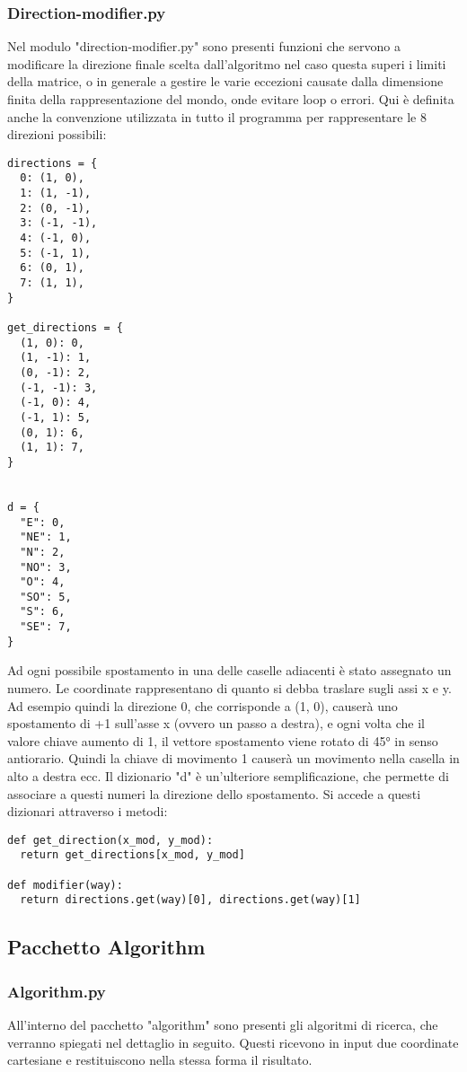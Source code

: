 \subsubsection{Direction-modifier.py}
Nel modulo "direction-modifier.py" sono presenti funzioni che servono a modificare la direzione finale scelta dall'algoritmo nel caso questa superi i limiti della matrice, o in generale a gestire le varie eccezioni causate dalla dimensione finita della rappresentazione del mondo, onde evitare loop o errori. Qui è definita anche la convenzione utilizzata in tutto il programma per rappresentare le 8 direzioni possibili:
\begin{verbatim}
directions = {
  0: (1, 0),
  1: (1, -1),
  2: (0, -1),
  3: (-1, -1),
  4: (-1, 0),
  5: (-1, 1),
  6: (0, 1),
  7: (1, 1),
}

get_directions = {
  (1, 0): 0,
  (1, -1): 1,
  (0, -1): 2,
  (-1, -1): 3,
  (-1, 0): 4,
  (-1, 1): 5,
  (0, 1): 6,
  (1, 1): 7,
}


d = {
  "E": 0,
  "NE": 1,
  "N": 2,
  "NO": 3,
  "O": 4,
  "SO": 5,
  "S": 6,
  "SE": 7,
}
\end{verbatim}

Ad ogni possibile spostamento in una delle caselle adiacenti è stato assegnato un numero. Le coordinate rappresentano di quanto si debba traslare sugli assi x e y. Ad esempio quindi la direzione 0, che corrisponde a (1, 0), causerà uno spostamento di +1 sull'asse x (ovvero un passo a destra), e ogni volta che il valore chiave aumento di 1, il vettore spostamento viene rotato di 45° in senso antiorario. Quindi la chiave di movimento 1 causerà un movimento nella casella in alto a destra ecc. Il dizionario "d" è un'ulteriore semplificazione, che permette di associare a questi numeri la direzione dello spostamento. Si accede a questi dizionari attraverso i metodi:
\begin{verbatim}
def get_direction(x_mod, y_mod):
  return get_directions[x_mod, y_mod]

def modifier(way):
  return directions.get(way)[0], directions.get(way)[1]

\end{verbatim}

\subsection{Pacchetto Algorithm}

\subsubsection{Algorithm.py}
All'interno del pacchetto "algorithm" sono presenti gli algoritmi di ricerca, che verranno spiegati nel dettaglio in seguito. Questi ricevono in input due coordinate cartesiane e restituiscono nella stessa forma il risultato.
	
